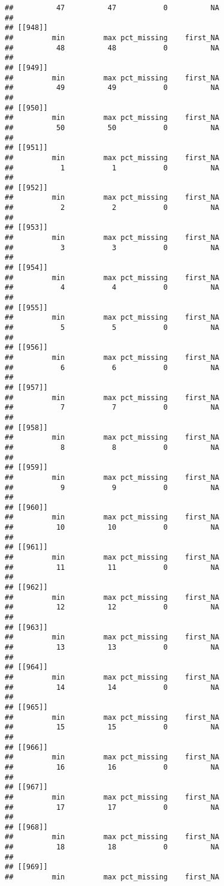 \documentclass[
]{article}
\begin{document}
\begin{verbatim}
##          47          47           0          NA 
## 
## [[948]]
##         min         max pct_missing    first_NA 
##          48          48           0          NA 
## 
## [[949]]
##         min         max pct_missing    first_NA 
##          49          49           0          NA 
## 
## [[950]]
##         min         max pct_missing    first_NA 
##          50          50           0          NA 
## 
## [[951]]
##         min         max pct_missing    first_NA 
##           1           1           0          NA 
## 
## [[952]]
##         min         max pct_missing    first_NA 
##           2           2           0          NA 
## 
## [[953]]
##         min         max pct_missing    first_NA 
##           3           3           0          NA 
## 
## [[954]]
##         min         max pct_missing    first_NA 
##           4           4           0          NA 
## 
## [[955]]
##         min         max pct_missing    first_NA 
##           5           5           0          NA 
## 
## [[956]]
##         min         max pct_missing    first_NA 
##           6           6           0          NA 
## 
## [[957]]
##         min         max pct_missing    first_NA 
##           7           7           0          NA 
## 
## [[958]]
##         min         max pct_missing    first_NA 
##           8           8           0          NA 
## 
## [[959]]
##         min         max pct_missing    first_NA 
##           9           9           0          NA 
## 
## [[960]]
##         min         max pct_missing    first_NA 
##          10          10           0          NA 
## 
## [[961]]
##         min         max pct_missing    first_NA 
##          11          11           0          NA 
## 
## [[962]]
##         min         max pct_missing    first_NA 
##          12          12           0          NA 
## 
## [[963]]
##         min         max pct_missing    first_NA 
##          13          13           0          NA 
## 
## [[964]]
##         min         max pct_missing    first_NA 
##          14          14           0          NA 
## 
## [[965]]
##         min         max pct_missing    first_NA 
##          15          15           0          NA 
## 
## [[966]]
##         min         max pct_missing    first_NA 
##          16          16           0          NA 
## 
## [[967]]
##         min         max pct_missing    first_NA 
##          17          17           0          NA 
## 
## [[968]]
##         min         max pct_missing    first_NA 
##          18          18           0          NA 
## 
## [[969]]
##         min         max pct_missing    first_NA 

\end{verbatim}
\end{document}
